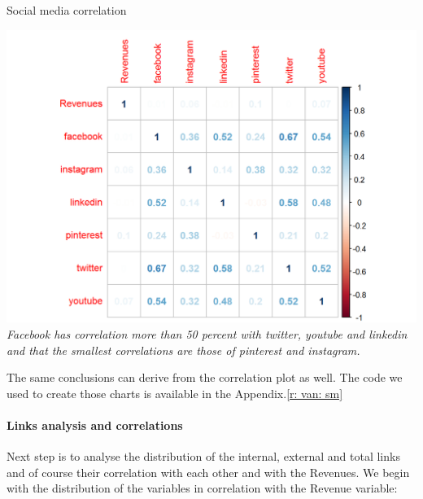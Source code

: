 \documentclass{article}
\begin{document}
\begin{table}[H]
\centering
\caption{Social media correlation}
\begin{center}
\includegraphics[scale=0.5]{../R/photos/22_REV_SM.png}  \\
\textit{Facebook has correlation more than 50 percent with twitter, youtube and linkedin and that the smallest correlations are those of pinterest and instagram.}
\end{center}
\end{table}

The same conclusions can derive from the correlation plot as well. The code we used to create those charts is available in the Appendix.\ref{r: van: sm}
\paragraph{Links analysis and correlations}
Next step is to analyse the distribution of the internal, external and total links and of course their correlation with each other and with the Revenues. We begin with the distribution of the variables in correlation with the Revenue variable:
\end{document}

